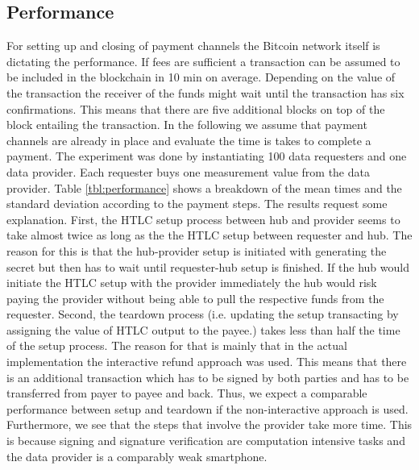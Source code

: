 \subsection{Performance}

For setting up and closing of payment channels the Bitcoin network itself is dictating the performance. If fees are sufficient a transaction can be assumed to be included in the blockchain in 10 min on average. Depending on the value of the transaction the receiver of the funds might wait until the transaction has six confirmations. This means that there are five additional blocks on top of the block entailing the transaction. 
In the following we assume that payment channels are already in place and evaluate the time is takes to complete a payment. The experiment was done by instantiating 100 data requesters and one data provider. Each requester buys one measurement value from the data provider. Table \ref{tbl:performance} shows a breakdown of the mean times and the standard deviation according to the payment steps. The results request some explanation. First, the HTLC setup process between hub and provider seems to take almost twice as long as the the HTLC setup between requester and hub. The reason for this is that the hub-provider setup is initiated with generating the secret but then has to wait until requester-hub setup is finished. If the hub would initiate the HTLC setup with the provider immediately the hub would risk paying the provider without being able to pull the respective funds from the requester. Second, the teardown process (i.e. updating the setup transacting by assigning the value of HTLC output to the payee.) takes less than half the time of the setup process. The reason for that is mainly that in the actual implementation the interactive refund approach was used. This means that there is an additional transaction which has to be signed by both parties and has to be transferred from payer to payee and back. Thus, we expect a comparable performance between setup and teardown if the non-interactive approach is used. Furthermore, we see that the steps that involve the provider take more time. This is because signing and signature verification are computation intensive tasks and the data provider is a comparably weak smartphone.

